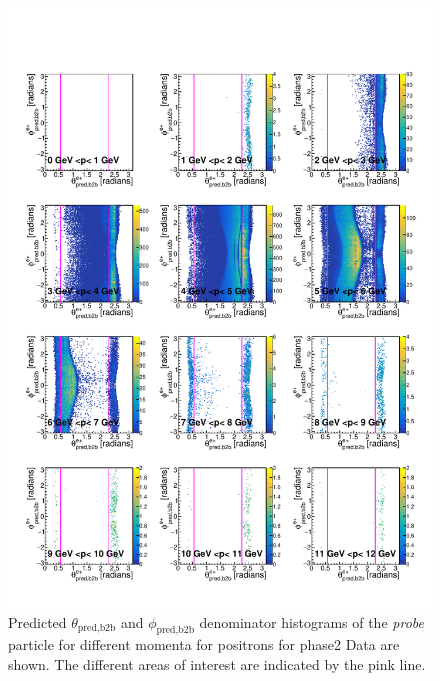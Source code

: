 \documentclass[a4paper,11pt,twosided,final,german,openbib,pdftex,listof=totoc,bibliography=totoc]{scrbook}
\begin{document}
\begin{appendix}
\begin{figure}[h!]
	\includegraphics[width=\textwidth]{Plots/master/RTPMepE_Data.pdf}
	\caption[Enumerator $\theta_{\textrm{pred,b2b}}$-$\phi_{\textrm{pred,b2b}}$ Positron Momentum Phase2 Data]{Predicted $\theta_{\textrm{pred,b2b}}$ and $\phi_{\textrm{pred,b2b}}$ denominator histograms of the \textit{probe} particle for different momenta for positrons for phase2 Data are shown. The different areas of interest are indicated by the pink line.}
	\label{plt:RTPMepE_Data}
\end{figure}



\end{appendix}
\end{document}
